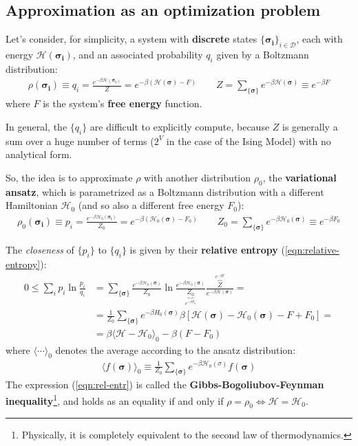 \documentclass[../../main.tex]{subfiles}
\begin{document}
\subsection{Approximation as an optimization problem}
Let's consider, for simplicity, a system with \textbf{discrete} states $\{\bm{\sigma_i}\}_{i \in \mathcal{D}}$, each with energy $\mathcal{H}(\bm{\sigma_i})$, and an associated probability $q_i$ given by a Boltzmann distribution:
\begin{align*}
    \rho(\bm{\sigma_i}) \equiv q_i = \frac{e^{-\beta \mathcal{H}(\bm{\sigma_i})}}{Z} = e^{-\beta(\mathcal{H}(\bm{\sigma})-F)} \qquad Z = \sum_{\{\bm{\sigma}\}} e^{-\beta \mathcal{H}(\bm{\sigma})}\equiv e^{-\beta F}
\end{align*}
where $F$ is the system's \textbf{free energy} function.

\medskip

In general, the $\{q_i\}$ are difficult to explicitly compute, because $Z$ is generally a sum over a huge number of terms ($2^V$ in the case of the Ising Model) with no analytical form.

\medskip

So, the idea is to approximate $\rho$ with another  distribution $\rho_0$, the \textbf{variational ansatz}, which is parametrized as a Boltzmann distribution with a different Hamiltonian $\mathcal{H}_0$ (and so also a different free energy $F_0$):
\begin{align}\label{eqn:variational-ansatz}
    \rho_0(\bm{\sigma_i}) \equiv p_i = \frac{e^{-\beta \mathcal{H}_0(\bm{\sigma_i})}}{Z_0} = e^{-\beta(\mathcal{H}_0(\bm{\sigma})-F_0)} \qquad Z_0 = \sum_{\{\bm{\sigma}\}} e^{-\beta \mathcal{H}_0(\bm{\sigma})} \equiv e^{-\beta F_0}
\end{align}

The \textit{closeness} of $\{p_i\}$ to $\{q_i\}$ is given by their \textbf{relative entropy} (\ref{eqn:relative-entropy}):
\begin{align} \nonumber
    0 \leq \sum_i p_i \ln \frac{p_i}{q_i} &= \sum_{\{\bm{\sigma}\}} \frac{e^{-\beta \mathcal{H}_0 (\bm{\sigma})}}{Z_0} \ln \frac{e^{-\beta \mathcal{H}_0(\bm{\sigma}) }}{\underbrace{Z_0}_{e^{-\beta F_0}} } \frac{\overbrace{Z}^{e^{-\beta F}} }{e^{-\beta \mathcal{H}(\bm{\sigma})}}  = \\
    &=  \nonumber
    \frac{1}{Z_0} \sum_{\{\bm{\sigma}\}} e^{-\beta H_0(\bm{\sigma})} \beta[\mathcal{H}(\bm{\sigma}) - \mathcal{H}_0(\bm{\sigma}) - F + F_0] =\\
    &= \beta \langle \mathcal{H}-\mathcal{H}_0 \rangle_0 - \beta (F-F_0) \label{eqn:rel-entr}
\end{align} 
where $\langle \cdots \rangle_0$ denotes the average according to the ansatz distribution:
\begin{align*}
    \langle f(\bm{\sigma}) \rangle_0 \equiv \frac{1}{Z_0} \sum_{\{\bm{\sigma}\}} e^{-\beta \mathcal{H}_0(\sigma)} f(\bm{\sigma})
\end{align*}
The expression (\ref{eqn:rel-entr}) is called the \textbf{Gibbs-Bogoliubov-Feynman inequality}\footnote{Physically, it is completely equivalent to the second law of thermodynamics.}, and holds as an equality if and only if $\rho = \rho_0 \Leftrightarrow \mathcal{H} = \mathcal{H}_0$. 
\end{document}
